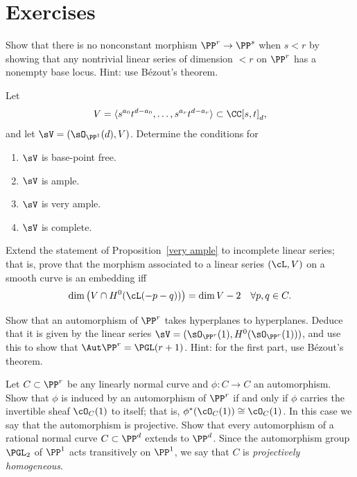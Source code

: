 \section*{Exercises}

\begin{exercise}\label{here there be basepoints}
 Show that there is no nonconstant morphism $\PP^r\to \PP^s$ when $s<r$ by showing that any nontrivial linear
 series of dimension $<r$ on $\PP^r$ has a nonempty base locus. Hint: use B\'ezout's theorem.
\end{exercise}

\begin{exercise}
Let 
$$
V = \langle s^{a_0}t^{d-a_0}, \dots, s^{a_r}t^{d-a_r}\rangle \subset \CC[s,t]_d,
$$
and let $\sV = (\sO_{\PP^1}(d), V)$. Determine the conditions for
\begin{enumerate}
 \item $\sV$ is base-point free.
 \item $\sV$ is ample.
 \item $\sV$ is very ample.
 \item $\sV$ is complete.
\end{enumerate}
\end{exercise}

\begin{exercise}
Extend the statement of Proposition~\ref{very ample} to incomplete linear series; that is, prove that the morphism associated to a linear series $(\cL, V)$
on a smooth curve is an embedding iff
$$
\dim\big( V \cap H^0(\cL(-p-q))\big) = \dim V - 2 \quad \forall p, q \in C.
$$
\end{exercise}

\begin{exercise}\label{aut Pr}
Show that an automorphism of $\PP^r$ takes hyperplanes to hyperplanes. Deduce that it is given by the linear series
$\sV = (\sO_{\PP^r}(1), H^0(\sO_{\PP^r}(1)))$, and use this to show that $\Aut \PP^r = \PGL(r+1)$. Hint: for the first part, use B\'ezout's theorem.
\end{exercise}

\begin{exercise}\label{projective automorphism}
Let $C \subset \PP^r$ be any linearly normal curve and $\phi: C \to C$ an automorphism. Show that $\phi$ is induced by an automorphism of $\PP^r$ if and only if $\phi$ carries the invertible sheaf $\cO_{C}(1)$ to itself; that is, $\phi^*(\cO_{C}(1)) \cong \cO_{C}(1)$. In this case we say that the automorphism
is projective. Show that every automorphism of a rational normal curve $C \subset \PP^d$  extends to $\PP^d$. Since the
automorphism group $\PGL_2$ of $\PP^1$ acts transitively on $\PP^1$, we say that
$C$ is \emph{projectively homogeneous}.
\end{exercise}

